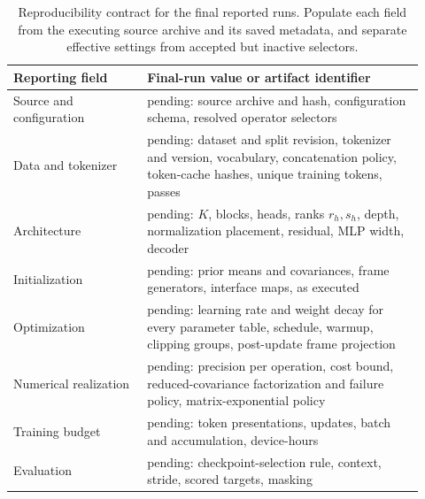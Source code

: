 \documentclass[twoside,11pt]{article}
\begin{document}
\begin{table}[htbp]
\centering
\small
\begin{tabular}{p{0.30\linewidth}p{0.62\linewidth}}
\toprule
Reporting field & Final-run value or artifact identifier \\
\midrule
Source and configuration & pending: source archive and hash, configuration schema, resolved operator selectors \\
Data and tokenizer & pending: dataset and split revision, tokenizer and version, vocabulary, concatenation policy, token-cache hashes, unique training tokens, passes \\
Architecture & pending: $K$, blocks, heads, ranks $r_h,s_h$, depth, normalization placement, residual, MLP width, decoder \\
Initialization & pending: prior means and covariances, frame generators, interface maps, as executed \\
Optimization & pending: learning rate and weight decay for every parameter table, schedule, warmup, clipping groups, post-update frame projection \\
Numerical realization & pending: precision per operation, cost bound, reduced-covariance factorization and failure policy, matrix-exponential policy \\
Training budget & pending: token presentations, updates, batch and accumulation, device-hours \\
Evaluation & pending: checkpoint-selection rule, context, stride, scored targets, masking \\
\bottomrule
\end{tabular}
\caption{Reproducibility contract for the final reported runs. Populate each field from the executing source archive and its saved metadata, and separate effective settings from accepted but inactive selectors.}
\label{tab:placeholder_methods_contract}
\end{table}
\end{document}
